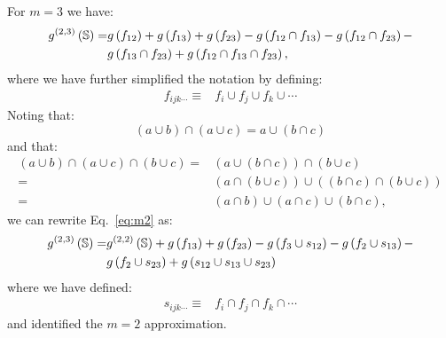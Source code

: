 \documentclass[11pt]{article}
\newcommand{\gxn}[1]{g\left(#1\right)}
\newcommand{\sets}{\mathbb{S}}
\newcommand{\gapprox}[1]{g^{(#1)}\left(\sets\right)}
\begin{document}
For $m=3$ we have:
\begin{align}
	\gapprox{2,3} =& \gxn{\Di} + \gxn{\Dj} + \gxn{\Dk} - \gxn{\IDiDj} - 
	                 \gxn{\IDiDk} -\nonumber\\
	               & \gxn{\IDjDk} + \gxn{\IDiDjDk}\label{eq:m2},
\end{align}
where we have further simplified the notation by defining:
\begin{align}
	f_{ijk\cdots} \equiv& f_i\cup f_j\cup f_k \cup \cdots
\end{align}
Noting that:
\begin{equation}
    \left(a\cup b\right) \cap \left(a\cup c\right) = a\cup \left(b\cap c\right)
\end{equation}
and that:
\begin{align}
	\left(a\cup b\right)\cap\left(a\cup c\right)\cap\left(b\cup c\right) =&
	\left(a\cup\left(b\cap c\right)\right)\cap\left(b \cup c\right) \nonumber\\
	=&
	\left(a\cap\left(b\cup c\right)\right)\cup
	\left(\left(b\cap c\right)\cap\left(b\cup c\right)\right)\nonumber\\
		=&
	\left(a\cap b\right)\cup \left(a\cap c\right)\cup \left(b\cap c\right),
\end{align}
we can rewrite Eq.~\eqref{eq:m2} as:
\begin{align}
	\gapprox{2,3} =& \gapprox{2,2} + \gxn{\Dj} + \gxn{\Dk} -
	                 \gxn{f_3 \cup \Ii} -
	                 \gxn{f_2 \cup \Ij} -\nonumber\\
	               & \gxn{f_2 \cup \Ik} +
	                 \gxn{\Ii\cup \Ij\cup \Ik}
\end{align}
where we have defined:
\begin{align}
	s_{ijk\cdots} \equiv& f_i\cap f_j\cap f_k \cap \cdots
\end{align}
and identified the $m=2$ approximation. 
\end{document}
